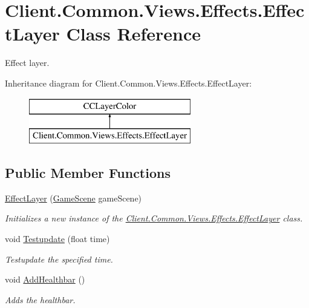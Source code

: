 \hypertarget{classClient_1_1Common_1_1Views_1_1Effects_1_1EffectLayer}{}\section{Client.\+Common.\+Views.\+Effects.\+Effect\+Layer Class Reference}
\label{classClient_1_1Common_1_1Views_1_1Effects_1_1EffectLayer}


Effect layer.  


Inheritance diagram for Client.\+Common.\+Views.\+Effects.\+Effect\+Layer\+:\begin{figure}[H]
\begin{center}
\leavevmode
\includegraphics[height=2.000000cm]{classClient_1_1Common_1_1Views_1_1Effects_1_1EffectLayer}
\end{center}
\end{figure}
\subsection*{Public Member Functions}
\begin{DoxyCompactItemize}
\item 
\hyperlink{classClient_1_1Common_1_1Views_1_1Effects_1_1EffectLayer_afb79e6d5eeb8d03f1cad682b34f65220}{Effect\+Layer} (\hyperlink{classClient_1_1Common_1_1Views_1_1GameScene}{Game\+Scene} game\+Scene)
\begin{DoxyCompactList}\small\item\em Initializes a new instance of the \hyperlink{classClient_1_1Common_1_1Views_1_1Effects_1_1EffectLayer}{Client.\+Common.\+Views.\+Effects.\+Effect\+Layer} class. \end{DoxyCompactList}\item 
void \hyperlink{classClient_1_1Common_1_1Views_1_1Effects_1_1EffectLayer_a4a8d761ac1f80d6827618f3ab9ed15a0}{Testupdate} (float time)
\begin{DoxyCompactList}\small\item\em Testupdate the specified time. \end{DoxyCompactList}\item 
void \hyperlink{classClient_1_1Common_1_1Views_1_1Effects_1_1EffectLayer_a7c1812ac4efa0de71e7de505374dc368}{Add\+Healthbar} ()
\begin{DoxyCompactList}\small\item\em Adds the healthbar. \end{DoxyCompactList}\end{DoxyCompactItemize}
